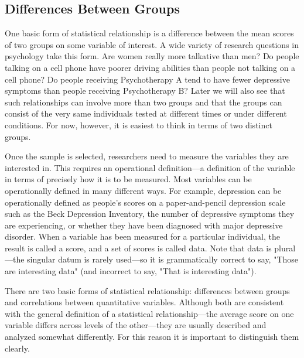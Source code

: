 \subsection{Differences Between Groups}
One basic form of statistical relationship is a difference between the mean scores of two groups on some variable of interest. A wide variety of research questions in psychology take this form. Are women really more talkative than men? Do people talking on a cell phone have poorer driving abilities than people not talking on a cell phone? Do people receiving Psychotherapy A tend to have fewer depressive symptoms than people receiving Psychotherapy B? Later we will also see that such relationships can involve more than two groups and that the groups can consist of the very same individuals tested at different times or under different conditions. For now, however, it is easiest to think in terms of two distinct groups.

 Once the sample is selected, researchers need to measure the variables they are interested in. This requires an operational definition---a definition of the variable in terms of precisely how it is to be measured. Most variables can be operationally defined in many different ways. For example, depression can be operationally defined as people's scores on a paper-and-pencil depression scale such as the Beck Depression Inventory, the number of depressive symptoms they are experiencing, or whether they have been diagnosed with major depressive disorder. When a variable has been measured for a particular individual, the result is called a score, and a set of scores is called data. Note that data is plural---the singular datum is rarely used---so it is grammatically correct to say, "Those are interesting data" (and incorrect to say, "That is interesting data").
 
 There are two basic forms of statistical relationship: differences between groups and correlations between quantitative variables. Although both are consistent with the general definition of a statistical relationship---the average score on one variable differs across levels of the other---they are usually described and analyzed somewhat differently. For this reason it is important to distinguish them clearly.
 
